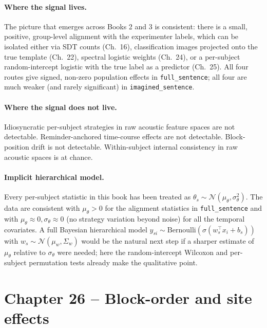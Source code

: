 \documentclass[11pt]{article}
\begin{document}
\paragraph{Where the signal lives.}
The picture that emerges across Books 2 and 3 is consistent: there is a
small, positive, group-level alignment with the experimenter labels,
which can be isolated either via SDT counts (Ch.~16), classification
images projected onto the true template (Ch.~22), spectral logistic
weights (Ch.~24), or a per-subject random-intercept logistic with the
true label as a predictor (Ch.~25). All four routes give signed,
non-zero population effects in \texttt{full\_sentence}; all four are
much weaker (and rarely significant) in \texttt{imagined\_sentence}.

\paragraph{Where the signal does not live.}
Idiosyncratic per-subject strategies in raw acoustic feature spaces are
not detectable. Reminder-anchored time-course effects are not
detectable. Block-position drift is not detectable. Within-subject
internal consistency in raw acoustic spaces is at chance.

\paragraph{Implicit hierarchical model.}
Every per-subject statistic in this book has been treated as
\(\theta_s \sim \mathcal{N}(\mu_\theta,\sigma_\theta^2)\). The data
are consistent with $\mu_\theta>0$ for the alignment statistics
in \texttt{full\_sentence} and with $\mu_\theta\approx 0,
\sigma_\theta\approx 0$ (no strategy variation beyond noise) for
all the temporal covariates. A full Bayesian hierarchical model
\(y_{si} \sim \mathrm{Bernoulli}(\sigma(w_s^\top x_i + b_s))\) with
$w_s\sim\mathcal{N}(\mu_w,\Sigma_w)$ would be the natural next step
if a sharper estimate of $\mu_\theta$ relative to $\sigma_\theta$
were needed; here the random-intercept Wilcoxon and per-subject
permutation tests already make the qualitative point.

\clearpage

\section{Chapter 26 -- Block-order and site effects}
\end{document}
